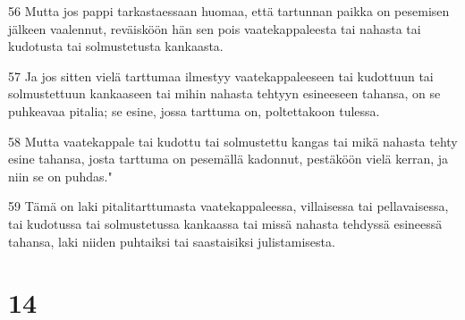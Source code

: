 \par 56 Mutta jos pappi tarkastaessaan huomaa, että tartunnan paikka on pesemisen jälkeen vaalennut, reväisköön hän sen pois vaatekappaleesta tai nahasta tai kudotusta tai solmustetusta kankaasta.
\par 57 Ja jos sitten vielä tarttumaa ilmestyy vaatekappaleeseen tai kudottuun tai solmustettuun kankaaseen tai mihin nahasta tehtyyn esineeseen tahansa, on se puhkeavaa pitalia; se esine, jossa tarttuma on, poltettakoon tulessa.
\par 58 Mutta vaatekappale tai kudottu tai solmustettu kangas tai mikä nahasta tehty esine tahansa, josta tarttuma on pesemällä kadonnut, pestäköön vielä kerran, ja niin se on puhdas."
\par 59 Tämä on laki pitalitarttumasta vaatekappaleessa, villaisessa tai pellavaisessa, tai kudotussa tai solmustetussa kankaassa tai missä nahasta tehdyssä esineessä tahansa, laki niiden puhtaiksi tai saastaisiksi julistamisesta.

\chapter{14}

